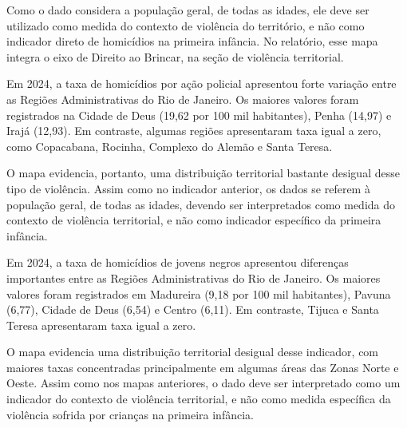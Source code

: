 Como o dado considera a população geral, de todas as idades, ele deve ser utilizado como medida do contexto de violência do território, e não como indicador direto de homicídios na primeira infância. No relatório, esse mapa integra o eixo de Direito ao Brincar, na seção de violência territorial.


Em 2024, a taxa de homicídios por ação policial apresentou forte variação entre as Regiões Administrativas do Rio de Janeiro. Os maiores valores foram registrados na Cidade de Deus (19,62 por 100 mil habitantes), Penha (14,97) e Irajá (12,93). Em contraste, algumas regiões apresentaram taxa igual a zero, como Copacabana, Rocinha, Complexo do Alemão e Santa Teresa.

O mapa evidencia, portanto, uma distribuição territorial bastante desigual desse tipo de violência. Assim como no indicador anterior, os dados se referem à população geral, de todas as idades, devendo ser interpretados como medida do contexto de violência territorial, e não como indicador específico da primeira infância.


Em 2024, a taxa de homicídios de jovens negros apresentou diferenças importantes entre as Regiões Administrativas do Rio de Janeiro. Os maiores valores foram registrados em Madureira (9,18 por 100 mil habitantes), Pavuna (6,77), Cidade de Deus (6,54) e Centro (6,11). Em contraste, Tijuca e Santa Teresa apresentaram taxa igual a zero.

O mapa evidencia uma distribuição territorial desigual desse indicador, com maiores taxas concentradas principalmente em algumas áreas das Zonas Norte e Oeste. Assim como nos mapas anteriores, o dado deve ser interpretado como um indicador do contexto de violência territorial, e não como medida específica da violência sofrida por crianças na primeira infância.

